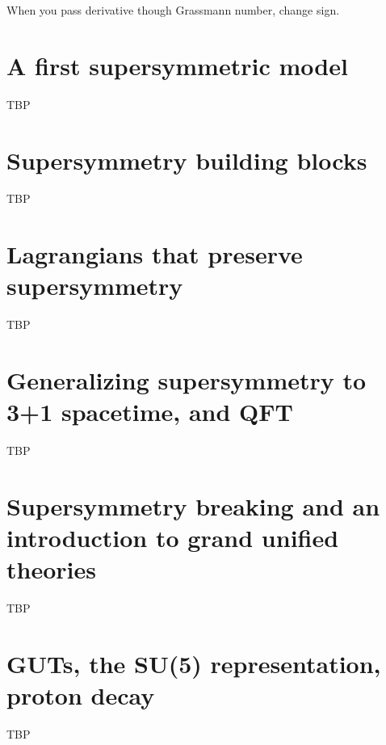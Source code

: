\documentclass[]{article}
\begin{document}
When you pass derivative though Grassmann number, change sign.

\section{A first supersymmetric model}

TBP

\section{Supersymmetry building blocks}

TBP

\section{Lagrangians that preserve supersymmetry}

TBP

\section{Generalizing supersymmetry to 3+1 spacetime, and QFT}

TBP

\section{Supersymmetry breaking and an introduction to grand unified theories}

TBP

\section{GUTs, the SU(5) representation, proton decay}

TBP



\raggedright

\end{document}
